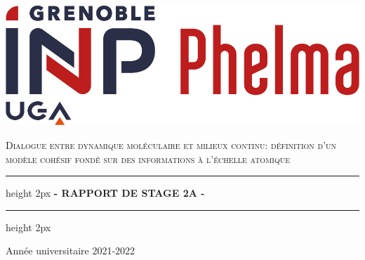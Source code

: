 \documentclass[11pt]{report}
\begin{document}
\begin{titlepage}
    \hfill
    \begin{center}
        \begin{minipage}{1\linewidth}
        \begin{minipage}{.5\linewidth}
              \begin{flushleft} %
             \includegraphics[scale=0.5]{logo phelma.png} %
            \end{flushleft}
        \end{minipage}
        \begin{minipage}{.5\linewidth}
              \begin{flushright}    
            \end{flushright}
        \end{minipage}
        \end{minipage}
        
        
        \textsc{\LARGE Dialogue entre dynamique moléculaire et milieux continu: définition d'un modèle cohésif fondé sur des informations à l'échelle atomique}

        \bigskip
        \bigskip
        \bigskip
        
        \hrule height 2px \bigskip
        { \huge \bfseries - RAPPORT DE STAGE 2A - \\[0.4cm] }
        
        \hrule height 2px 

        \bigskip
        {\large Année universitaire 2021-2022} \\[0.7cm] 
        

\end{center}
\end{titlepage}
\end{document}
